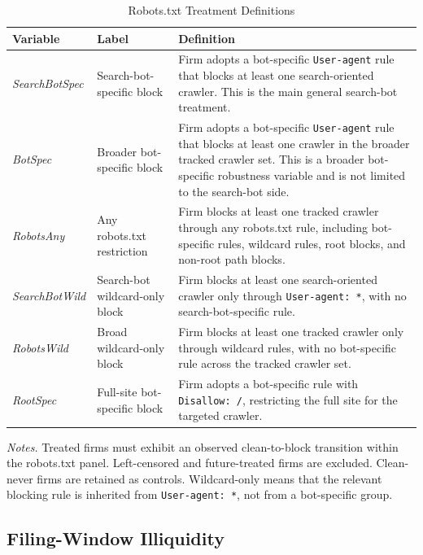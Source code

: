 \documentclass[11pt]{article}
\newcommand{\TableNote}[1]{%
    \par\vspace{0.35em}
    \begin{minipage}{0.96\textwidth}
    \footnotesize\emph{Notes.} #1
    \end{minipage}
}
\begin{document}
\begin{table}[!htbp]
\centering
\caption{Robots.txt Treatment Definitions}
\label{tab:robots_treatment_definitions}
\begin{threeparttable}
\small
\begin{tabular}{llp{8.1cm}}
\toprule
Variable & Label & Definition \\
\midrule
\textit{SearchBotSpec} &
Search-bot-specific block &
Firm adopts a bot-specific \texttt{User-agent} rule that blocks at least
one search-oriented crawler.  This is the main general search-bot
treatment. \\
\textit{BotSpec} &
Broader bot-specific block &
Firm adopts a bot-specific \texttt{User-agent} rule that blocks at least
one crawler in the broader tracked crawler set.  This is a broader
bot-specific robustness variable and is not limited to the search-bot side. \\
\textit{RobotsAny} &
Any robots.txt restriction &
Firm blocks at least one tracked crawler through any robots.txt rule,
including bot-specific rules, wildcard rules, root blocks, and non-root
path blocks. \\
\textit{SearchBotWild} &
Search-bot wildcard-only block &
Firm blocks at least one search-oriented crawler only through
\texttt{User-agent: *}, with no search-bot-specific rule. \\
\textit{RobotsWild} &
Broad wildcard-only block &
Firm blocks at least one tracked crawler only through wildcard rules,
with no bot-specific rule across the tracked crawler set. \\
\textit{RootSpec} &
Full-site bot-specific block &
Firm adopts a bot-specific rule with \texttt{Disallow: /}, restricting
the full site for the targeted crawler. \\
\bottomrule
\end{tabular}
\TableNote{Treated firms must exhibit an observed clean-to-block transition
within the robots.txt panel. Left-censored and future-treated firms are
excluded. Clean-never firms are retained as controls. Wildcard-only means
that the relevant blocking rule is inherited from \texttt{User-agent: *},
not from a bot-specific group.}
\end{threeparttable}
\end{table}

\subsection{Filing-Window Illiquidity}
\label{subsec:robots_amihud}
\end{document}
